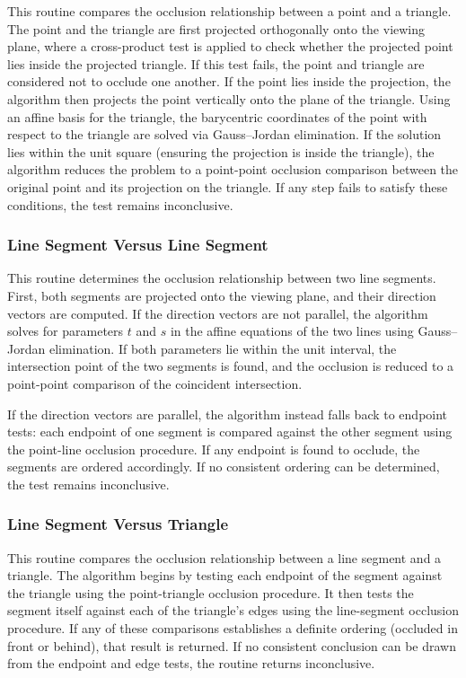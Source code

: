 This routine compares the occlusion relationship between a point and 
a triangle. The point and the triangle are first projected orthogonally 
onto the viewing plane, where a cross-product test is applied to check 
whether the projected point lies inside the projected triangle. If this 
test fails, the point and triangle are considered not to occlude one 
another. If the point lies inside the projection, the algorithm then 
projects the point vertically onto the plane of the triangle. Using an 
affine basis for the triangle, the barycentric coordinates of the point 
with respect to the triangle are solved via Gauss--Jordan elimination. 
If the solution lies within the unit square (ensuring the projection is 
inside the triangle), the algorithm reduces the problem to a point-point 
occlusion comparison between the original point and its projection on the 
triangle. If any step fails to satisfy these conditions, the test remains 
inconclusive.

\subsubsection{Line Segment Versus Line Segment}

This routine determines the occlusion relationship between two line 
segments. First, both segments are projected onto the viewing plane, 
and their direction vectors are computed. If the direction vectors are 
not parallel, the algorithm solves for parameters \(t\) and \(s\) in 
the affine equations of the two lines using Gauss--Jordan elimination. 
If both parameters lie within the unit interval, the intersection point 
of the two segments is found, and the occlusion is reduced to a 
point-point comparison of the coincident intersection. 

If the direction vectors are parallel, the algorithm instead falls back 
to endpoint tests: each endpoint of one segment is compared against the 
other segment using the point-line occlusion procedure. If any endpoint 
is found to occlude, the segments are ordered accordingly. If no 
consistent ordering can be determined, the test remains inconclusive.

\subsubsection{Line Segment Versus Triangle}

This routine compares the occlusion relationship between a line segment 
and a triangle. The algorithm begins by testing each endpoint of the 
segment against the triangle using the point-triangle occlusion 
procedure. It then tests the segment itself against each of the 
triangle's edges using the line-segment occlusion procedure. If any of 
these comparisons establishes a definite ordering (occluded in front or 
behind), that result is returned. If no consistent conclusion can be 
drawn from the endpoint and edge tests, the routine returns 
inconclusive.

